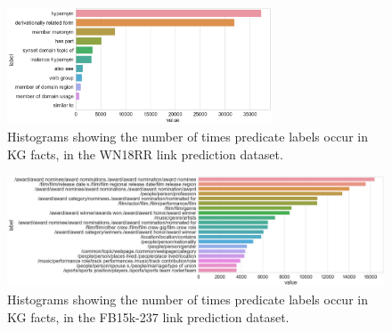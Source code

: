 \bigskip
\bigskip



\begin{figure}[H]
   	\centering
    	\includegraphics[width=0.7\textwidth, height=0.3\textheight]{WN18RR_Predicate_Counts}
	\caption{Histograms showing the number of times predicate labels occur in KG facts, in the WN18RR link prediction dataset.}
\end{figure}

\begin{figure}[H]
   	\centering
    	\includegraphics[width=1.0\textwidth, height=0.3\textheight]{FB15k-237_Predicate_Counts}
	\caption{Histograms showing the number of times predicate labels occur in KG facts, in the FB15k-237 link prediction dataset.}
\end{figure}

\bigskip
\bigskip
\bigskip
\bigskip



